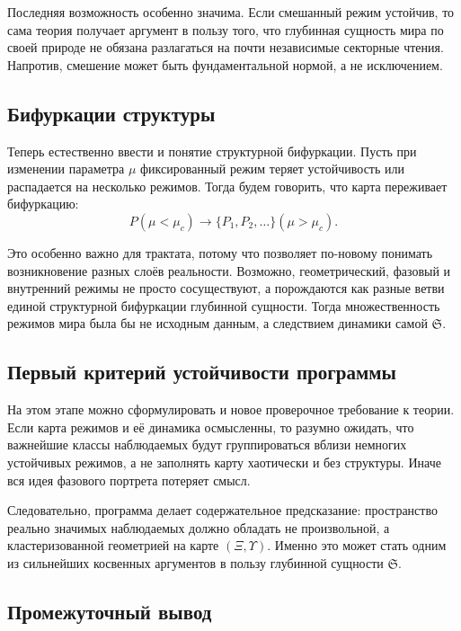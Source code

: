 \documentclass[12pt,a4paper]{article}
\begin{document}
Последняя возможность особенно значима. Если смешанный режим устойчив, то сама теория получает аргумент в пользу того, что глубинная сущность мира по своей природе не обязана разлагаться на почти независимые секторные чтения. Напротив, смешение может быть фундаментальной нормой, а не исключением.

\subsection{Бифуркации структуры}

Теперь естественно ввести и понятие структурной бифуркации. Пусть при изменении параметра \(\mu\) фиксированный режим теряет устойчивость или распадается на несколько режимов. Тогда будем говорить, что карта переживает бифуркацию:
\begin{equation}
P(\mu < \mu_c) \longrightarrow \{P_1,P_2,\dots\}(\mu > \mu_c).
\end{equation}

Это особенно важно для трактата, потому что позволяет по-новому понимать возникновение разных слоёв реальности. Возможно, геометрический, фазовый и внутренний режимы не просто сосуществуют, а порождаются как разные ветви единой структурной бифуркации глубинной сущности. Тогда множественность режимов мира была бы не исходным данным, а следствием динамики самой \(\mathfrak{S}\).

\subsection{Первый критерий устойчивости программы}

На этом этапе можно сформулировать и новое проверочное требование к теории. Если карта режимов и её динамика осмысленны, то разумно ожидать, что важнейшие классы наблюдаемых будут группироваться вблизи немногих устойчивых режимов, а не заполнять карту хаотически и без структуры. Иначе вся идея фазового портрета потеряет смысл.

Следовательно, программа делает содержательное предсказание: пространство реально значимых наблюдаемых должно обладать не произвольной, а кластеризованной геометрией на карте \((\Xi,\Upsilon)\). Именно это может стать одним из сильнейших косвенных аргументов в пользу глубинной сущности \(\mathfrak{S}\).

\subsection{Промежуточный вывод}
\end{document}

